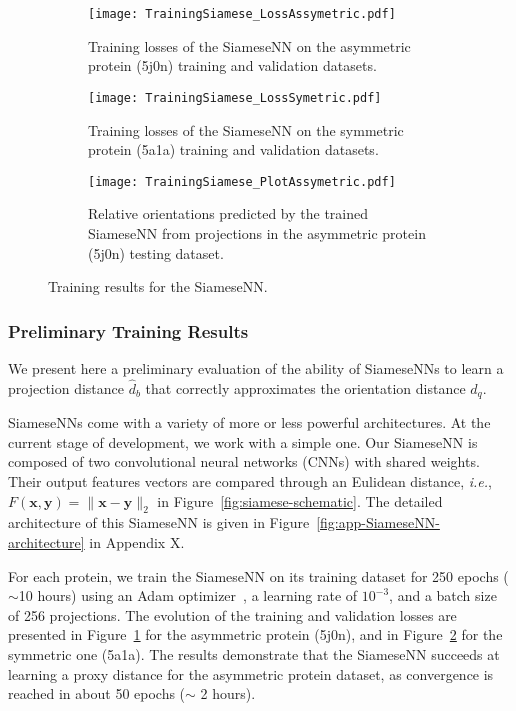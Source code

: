\begin{figure}[t!]
    \centering
    \begin{subfigure}[t]{0.4\textwidth}
        \texttt{[image: TrainingSiamese\_LossAssymetric.pdf]}
        \caption{Training losses of the SiameseNN on the asymmetric protein (5j0n) training and validation datasets.}
        \label{fig:losses-siamese-assym}
    \end{subfigure} \quad \quad
    \begin{subfigure}[t]{0.4\textwidth}
        \texttt{[image: TrainingSiamese\_LossSymetric.pdf]}
        \caption{Training losses of the SiameseNN on the symmetric protein (5a1a) training and validation datasets.}
        \label{fig:losses-siamese-sym}
    \end{subfigure} \vspace{0.45cm}
    \begin{subfigure}[t]{0.4\textwidth}
        \texttt{[image: TrainingSiamese\_PlotAssymetric.pdf]}
        \caption{Relative orientations predicted by the trained SiameseNN from projections in the asymmetric protein (5j0n) testing dataset. }
        \label{fig:learned-distance-siamese}
    \end{subfigure} \vspace{0.35cm}
    \caption{Training results for the SiameseNN.}
    \label{fig:losses-siamese}
\end{figure}

\subsubsection{Preliminary Training Results}

We present here a preliminary evaluation of the ability of SiameseNNs to learn a projection distance $\widehat{d}_b$ that correctly approximates the orientation distance $d_q$.

SiameseNNs come with a variety of more or less powerful architectures. At the current stage of development, we work with a simple one. Our SiameseNN is composed of two convolutional neural networks (CNNs) with shared weights. Their output features vectors are compared through an Eulidean distance, \textit{i.e.}, $F(\mathbf{x},\mathbf{y})=\lVert \mathbf{x}-\mathbf{y}\rVert_2$ in Figure~\ref{fig:siamese-schematic}. The detailed architecture of this SiameseNN is given in Figure~\ref{fig:app-SiameseNN-architecture} in Appendix X.

For each protein, we train the SiameseNN on its training dataset for 250 epochs ($\sim$10 hours) using an Adam optimizer~\cite{kingma2014adam}, a learning rate of $10^{-3}$, and a batch size of 256 projections. The evolution of the training and validation losses are presented in Figure~\ref{fig:losses-siamese-assym} for the asymmetric protein (5j0n), and in Figure~\ref{fig:losses-siamese-sym} for the symmetric one (5a1a). The results demonstrate that the SiameseNN succeeds at learning a proxy distance for the asymmetric protein dataset, as convergence is reached in about 50 epochs ($\sim$ 2 hours).

